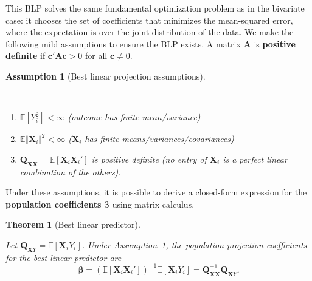 \documentclass[
  13pt,
  letterpaper,
  DIV=11,
  numbers=noendperiod]{scrreprt}
\providecommand{\tightlist}{%
  \setlength{\itemsep}{0pt}\setlength{\parskip}{0pt}}
\newcommand{\mb}{\bm}
\newcommand{\E}{\mathbb{E}}
\newcommand{\X}{\mb{X}}
\newcommand{\bfbeta}{\mb{\beta}}
\theoremstyle{plain}
\newtheorem{theorem}{Theorem}[chapter]
\theoremstyle{plain}
\newtheorem{conjecture}{Assumption}[chapter]
\theoremstyle{definition}
\theoremstyle{definition}
\theoremstyle{remark}
\begin{document}
This BLP solves the same fundamental optimization problem as in the
bivariate case: it chooses the set of coefficients that minimizes the
mean-squared error, where the expectation is over the joint distribution
of the data. We make the following mild assumptions to ensure the BLP
exists. A matrix \(\mb{A}\) is \textbf{positive definite} if
\(\mb{c}'\mb{A}\mb{c} >0\) for all \(\mb{c} \neq 0\).

\begin{conjecture}[Best linear projection
assumptions]\protect\hypertarget{cnj-blp-assumptions}{}\label{cnj-blp-assumptions}

~

\begin{enumerate}
\def\labelenumi{\arabic{enumi}.}
\tightlist
\item
  \(\E[Y_i^2] < \infty\) (outcome has finite mean/variance)
\item
  \(\E\Vert \X_i \Vert^2 < \infty\) (\(\X_i\) has finite
  means/variances/covariances)
\item
  \(\mb{Q}_{\mb{XX}} = \E[\X_i\X_i']\) is positive definite (no entry of
  \(\X_i\) is a perfect linear combination of the others).\\
\end{enumerate}

\end{conjecture}

Under these assumptions, it is possible to derive a closed-form
expression for the \textbf{population coefficients} \(\bfbeta\) using
matrix calculus.

\begin{theorem}[Best linear
predictor]\protect\hypertarget{thm-blp}{}\label{thm-blp}

Let \(\mb{Q}_{\X Y} = \E[\X_iY_i]\). Under
Assumption~\ref{cnj-blp-assumptions}, the population projection
coefficients for the best linear predictor are \[
\bfbeta = \left(\E[\X_{i}\X_{i}']\right)^{-1}\E[\X_{i}Y_{i}] = \mb{Q}_{\mb{XX}}^{-1}\mb{Q}_{\mb{X}Y}.
\]

\end{theorem}
\end{document}
